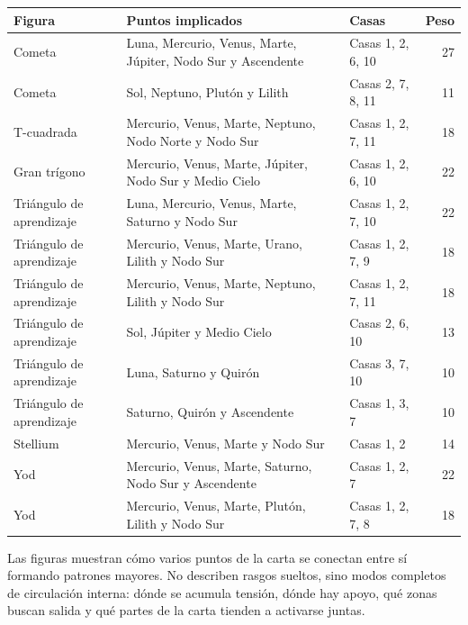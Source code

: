 \documentclass[11pt,a4paper]{article}
\begin{document}
\begin{center}
\begin{tabular}{p{3.2cm}p{7.2cm}p{2.8cm}r}
  \toprule
  \textbf{Figura} & \textbf{Puntos implicados} & \textbf{Casas} & \textbf{Peso} \\
  \midrule
  Cometa & Luna, Mercurio, Venus, Marte, Júpiter, Nodo Sur y Ascendente & Casas 1, 2, 6, 10 & 27 \\
  Cometa & Sol, Neptuno, Plutón y Lilith & Casas 2, 7, 8, 11 & 11 \\
  T-cuadrada & Mercurio, Venus, Marte, Neptuno, Nodo Norte y Nodo Sur & Casas 1, 2, 7, 11 & 18 \\
  Gran trígono & Mercurio, Venus, Marte, Júpiter, Nodo Sur y Medio Cielo & Casas 1, 2, 6, 10 & 22 \\
  Triángulo de aprendizaje & Luna, Mercurio, Venus, Marte, Saturno y Nodo Sur & Casas 1, 2, 7, 10 & 22 \\
  Triángulo de aprendizaje & Mercurio, Venus, Marte, Urano, Lilith y Nodo Sur & Casas 1, 2, 7, 9 & 18 \\
  Triángulo de aprendizaje & Mercurio, Venus, Marte, Neptuno, Lilith y Nodo Sur & Casas 1, 2, 7, 11 & 18 \\
  Triángulo de aprendizaje & Sol, Júpiter y Medio Cielo & Casas 2, 6, 10 & 13 \\
  Triángulo de aprendizaje & Luna, Saturno y Quirón & Casas 3, 7, 10 & 10 \\
  Triángulo de aprendizaje & Saturno, Quirón y Ascendente & Casas 1, 3, 7 & 10 \\
  Stellium & Mercurio, Venus, Marte y Nodo Sur & Casas 1, 2 & 14 \\
  Yod & Mercurio, Venus, Marte, Saturno, Nodo Sur y Ascendente & Casas 1, 2, 7 & 22 \\
  Yod & Mercurio, Venus, Marte, Plutón, Lilith y Nodo Sur & Casas 1, 2, 7, 8 & 18 \\
  \bottomrule
\end{tabular}
\end{center}

\vspace{0.8cm}

Las figuras muestran cómo varios puntos de la carta se conectan entre sí formando patrones mayores. No describen rasgos sueltos, sino modos completos de circulación interna: dónde se acumula tensión, dónde hay apoyo, qué zonas buscan salida y qué partes de la carta tienden a activarse juntas.

\newpage
\end{document}
